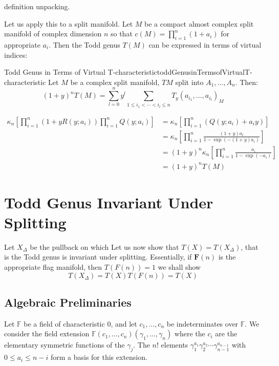 \documentclass{book}
\renewcommand{\bf}[1]{\textbf{#1}}
\begin{document}
\begin{Proof}
  definition unpacking.
\end{Proof}



Let us apply this to a split manifold. Let $M$ be a compact almost complex split manifold of complex dimension
$n$ so that $c(M) = \prod_{i=1}^n (1+a_i)$ for appropriate $a_i$. Then the Todd genus $T(M)$ can be expressed in terms of virtual indices:
\begin{prop}{Todd Genus in Terms of Virtual T-characteristic}{toddGenusinTermsofVirtualT-characteristic}
  Let $M$ be a complex split manifold, $TM$ split into $A_1, ..., A_n$. Then:
    \[
  (1+y)^n T(M) = \sum_{l=0}^n y^l \sum_{1\leq i_1<\cdots<i_l\leq n} T_y(a_{i_1},\ldots,a_{i_l})_M
  \]
\end{prop}

\begin{Proof}
\begin{align*}
  \kappa_n\left[\prod_{i=1}^n (1+yR(y;a_i)) \prod_{i=1}^n Q(y;a_i)\right]
  &= \kappa_n\left[\prod_{i=1}^n (Q(y;a_i) + a_i y)\right] \\
  &= \kappa_n\left[\prod_{i=1}^n \frac{(1+y)a_i}{1-\exp(-(1+y)a_i)}\right] \\
  &= (1+y)^n \kappa_n\left[\prod_{i=1}^n \frac{a_i}{1-\exp(-a_i)}\right]\\
  &= (1+y)^n T(M)
\end{align*}

\end{Proof}




\section{Todd Genus Invariant Under Splitting}\label{sec:ToddGenusSplittingInvariatn}

Let $X_\Delta$ be the pullback on which
Let us now show that $T(X) = T(X_\Delta)$, that is the Todd genus is invariant under splitting. Essentially,
if $\bf{F}(n)$ is the appropriate flag manifold, then $T(F(n)) = 1$ we shall show
\[
  T(X_\Delta) = T(X)T(F(n)) = T(X)
\]

\subsection{Algebraic Preliminaries} \label{sec:AlgebraicPreliminaries}

Let $\mathbb{F}$ be a field of characteristic 0, and let $c_1, \dots, c_n$ be indeterminates over $\mathbb{F}$. We consider the field extension $\mathbb{F}(c_1, \dots, c_n)(\gamma_1, \dots, \gamma_n)$ where the $c_i$ are the elementary symmetric functions of the $\gamma_j$. The $n!$ elements $\gamma_1^{a_1} \gamma_2^{a_2} \cdots \gamma_{n-1}^{a_{n-1}}$ with $0 \le a_i \le n-i$ form a basis for this extension.
\end{document}
